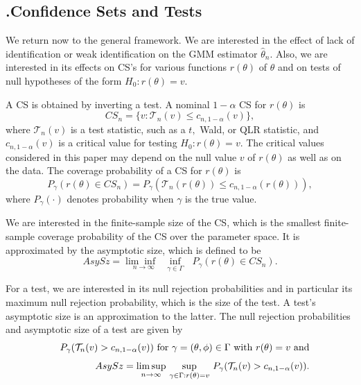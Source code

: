 \documentclass[12pt,thmsb,titlepage,final,oneside,letterpaper]{article}
\begin{document}
\subsection{\hspace{-0.23in}\textbf{.}\hspace{0.18in}Confidence Sets and
Tests}

\hspace{0.25in}We return now to the general framework. We are interested in
the effect of lack of identification or weak identification on the GMM
estimator $\widehat{\theta }_{n}.$ Also, we are interested in its effects on
CS's for various functions $r(\theta )$ of $\theta $ and on tests of null
hypotheses of the form $H_{0}:r(\theta )=v.$

A CS is obtained by inverting a test. A nominal $1-\alpha $ CS for $r(\theta
)$ is 
\begin{equation}
CS_{n}=\{v:\mathcal{T}_{n}(v)\leq c_{n,1-\alpha }(v)\},  \label{invert CI}
\end{equation}%
where $\mathcal{T}_{n}\left( v\right) $ is a test statistic, such as a $t,$
Wald, or QLR statistic, and $c_{n,1-\alpha }\left( v\right) $ is a critical
value for testing $H_{0}:r(\theta )=v.$ The critical values considered in
this paper may depend on the null value $v$ of $r(\theta )$ as well as on
the data. The coverage probability of a CS for $r(\theta )$ is%
\begin{equation}
P_{\gamma }(r(\theta )\in CS_{n})=P_{\gamma }(\mathcal{T}_{n}(r(\theta
))\leq c_{n,1-\alpha }(r(\theta ))),  \label{coverage prob}
\end{equation}%
where $P_{\gamma }\left( \cdot \right) $ denotes probability when $\gamma $
is the true value.

We are interested in the finite-sample size of the CS, which is the smallest
finite-sample coverage probability of the CS over the parameter space. It is
approximated by the asymptotic size, which is defined to be%
\begin{equation}
AsySz=\underset{n\rightarrow \infty }{\lim \inf \text{ }}\underset{\gamma
\in \Gamma }{\inf }\text{ }P_{\gamma }(r(\theta )\in CS_{n}).
\label{AsySz Confid Set defn}
\end{equation}

For a test, we are interested in its null rejection probabilities and in
particular its maximum null rejection probability, which is the size of the
test. A test's asymptotic size is an approximation to the latter. The null
rejection probabilities and asymptotic size of a test are given by%
\begin{eqnarray}
&&P_{\gamma }(\mathcal{T}_{n}(v)>c_{n,1-\alpha }(v))\text{ for }\gamma 
\overset{}{=}(\theta ,\phi )\overset{}{\in }\Gamma \text{ with }r(\theta )%
\underset{}{=}v\text{ and}  \notag \\
&&AsySz\overset{}{=}\underset{n\rightarrow \infty }{\lim \sup }\text{ }%
\underset{\gamma \in \Gamma :r(\theta )=v}{\sup }\text{ }P_{\gamma }(%
\mathcal{T}_{n}(v)>c_{n,1-\alpha }(v)).  \label{AsySz Test defn}
\end{eqnarray}
\end{document}
